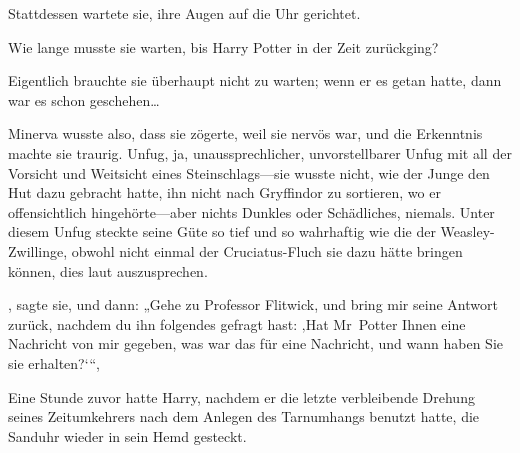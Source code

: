 Stattdessen wartete sie, ihre Augen auf die Uhr gerichtet.

Wie lange musste sie warten, bis Harry Potter in der Zeit zurückging?

Eigentlich brauchte sie überhaupt nicht zu warten; wenn er es getan hatte, dann war es schon geschehen…

Minerva wusste also, dass sie zögerte, weil sie nervös war, und die Erkenntnis machte sie traurig. Unfug, ja, unaussprechlicher, unvorstellbarer Unfug mit all der Vorsicht und Weitsicht eines Steinschlags—sie wusste nicht, wie der Junge den Hut dazu gebracht hatte, ihn nicht nach Gryffindor zu sortieren, wo er offensichtlich hingehörte—aber nichts Dunkles oder Schädliches, niemals. Unter diesem Unfug steckte seine Güte so tief und so wahrhaftig wie die der Weasley-Zwillinge, obwohl nicht einmal der Cruciatus-Fluch sie dazu hätte bringen können, dies laut auszusprechen.

, sagte sie, und dann:
„Gehe zu Professor Flitwick, und bring mir seine Antwort zurück, nachdem du ihn folgendes gefragt hast: ‚Hat Mr~Potter Ihnen eine Nachricht von mir gegeben, was war das für eine Nachricht, und wann haben Sie sie erhalten?‘“,

\later

Eine Stunde zuvor hatte Harry, nachdem er die letzte verbleibende Drehung seines Zeitumkehrers nach dem Anlegen des Tarnumhangs benutzt hatte, die Sanduhr wieder in sein Hemd gesteckt.

